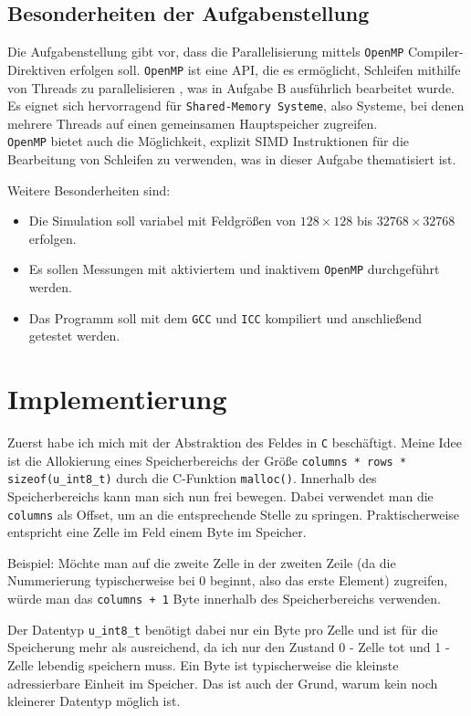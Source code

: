 \documentclass[german,plainarticle,hyperref,utf8]{zihpub}
\begin{document}
	\subsection{Besonderheiten der Aufgabenstellung}
	Die Aufgabenstellung gibt vor, dass die Parallelisierung mittels \texttt{OpenMP} Compiler-Direktiven erfolgen soll. \texttt{OpenMP} ist eine API, die es ermöglicht, Schleifen mithilfe von Threads zu parallelisieren \cite{openmp}, was in Aufgabe B ausführlich bearbeitet wurde. Es eignet sich hervorragend für \texttt{Shared-Memory Systeme}, also Systeme, bei denen mehrere Threads auf einen gemeinsamen Hauptspeicher zugreifen.\\
	\texttt{OpenMP} bietet auch die Möglichkeit, explizit SIMD Instruktionen für die Bearbeitung von Schleifen zu verwenden, was in dieser Aufgabe thematisiert ist.
	
	Weitere Besonderheiten sind:
	\begin{itemize}
		\item Die Simulation soll variabel mit Feldgrößen von $128\times 128$ bis $32768\times 32768$ erfolgen.
		\item Es sollen Messungen mit aktiviertem und inaktivem \texttt{OpenMP} durchgeführt werden.
		\item Das Programm soll mit dem \texttt{GCC} und \texttt{ICC} kompiliert und anschließend getestet werden.
	\end{itemize}
	\newpage
	\section{Implementierung}
	Zuerst habe ich mich mit der Abstraktion des Feldes in \texttt{C} beschäftigt. Meine Idee ist die Allokierung eines Speicherbereichs der Größe \texttt{columns * rows * sizeof(u\_int8\_t)} durch die C-Funktion \texttt{malloc()}. Innerhalb des Speicherbereichs kann man sich nun frei bewegen. Dabei verwendet man die \texttt{columns} als Offset, um an die entsprechende Stelle zu springen. Praktischerweise entspricht eine Zelle im Feld einem Byte im Speicher.
	
	Beispiel: Möchte man auf die zweite Zelle in der zweiten Zeile (da die Nummerierung typischerweise bei 0 beginnt, also das erste Element) zugreifen, würde man das \texttt{columns + 1} Byte innerhalb des Speicherbereichs verwenden.
	
	Der Datentyp \texttt{u\_int8\_t} benötigt dabei nur ein Byte pro Zelle und ist für die Speicherung mehr als ausreichend, da ich nur den Zustand 0 - Zelle tot und 1 - Zelle lebendig speichern muss. Ein Byte ist typischerweise die kleinste adressierbare Einheit im Speicher. Das ist auch der Grund, warum kein noch kleinerer Datentyp möglich ist.\\
	
\end{document}

